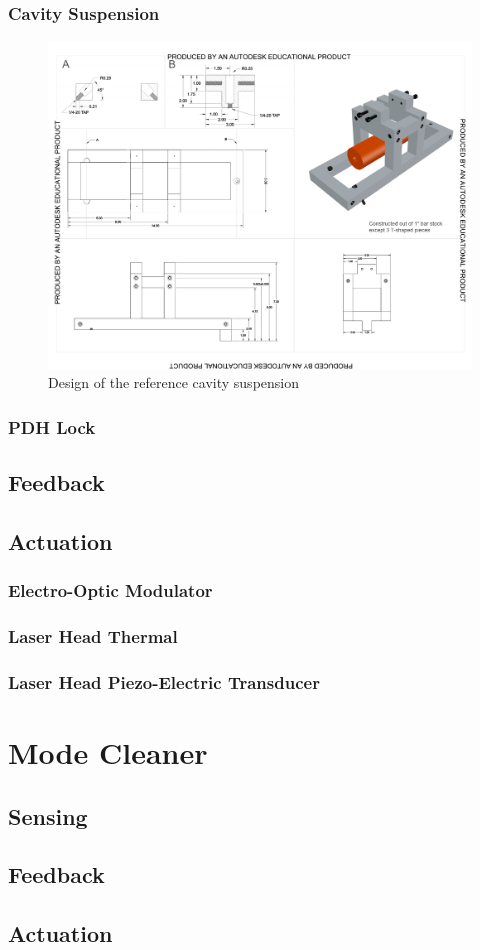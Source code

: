 \subsubsection{Cavity Suspension}
\begin{figure}[htbp]
	\centering
		\includegraphics[width=15cm]{./figures/refcavsusdesign.pdf}
	\caption[Reference Cavity Suspension Design]{Design of the reference cavity suspension}
	\label{fig:refcav_sus}
\end{figure}

\subsubsection{PDH Lock}

\subsection{Feedback}

\subsection{Actuation}
\subsubsection{Electro-Optic Modulator}
\subsubsection{Laser Head Thermal}
\subsubsection{Laser Head Piezo-Electric Transducer}

\section{Mode Cleaner}

\subsection{Sensing}

\subsection{Feedback}

\subsection{Actuation}
